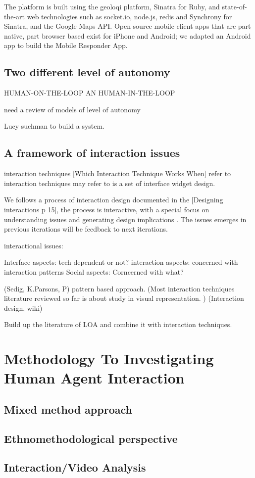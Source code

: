 The platform is built using the geoloqi platform, Sinatra for Ruby, and state-of- the-art web technologies such as socket.io, node.js, redis and Synchrony for Sinatra, and the Google Maps API. Open source mobile client apps that are part native, part browser based exist for iPhone and Android; we adapted an Android app to build the Mobile Responder App.\\

\section{Two different level of autonomy}
HUMAN-ON-THE-LOOP AN HUMAN-IN-THE-LOOP

need a review of models of level of autonomy 

Lucy suchman to build a system. 

\section{A framework of interaction issues}
interaction techniques 
[Which Interaction Technique Works When] refer to interaction techniques may refer to is a set of interface widget design.


We follows a process of interaction design documented in the [Designing interactions p 15], the process is interactive, with a special focus on understanding issues and generating design implications . The issues emerges in previous iterations will be feedback to next iterations. 

interactional issues: 

Interface aspects: tech dependent or not?
interaction aspects: concerned with interaction patterns 
Social aspects: Corncerned with what? 

(Sedig, K.Parsons, P) pattern based approach.
(Most interaction techniques literature reviewed so far is about study in visual representation. )
(Interaction design, wiki)

Build up the literature of LOA and combine it with interaction techniques. 


\chapter{ Methodology To Investigating Human Agent Interaction}

\section{ Mixed method approach }

\section{ Ethnomethodological perspective }

\section{ Interaction/Video Analysis}



